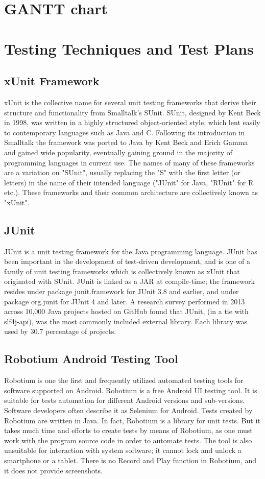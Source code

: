 	\section{GANTT chart
}
	\section{Testing Techniques and Test Plans
}
\subsection{xUnit Framework}
xUnit is the collective name for several unit testing frameworks that derive their structure and functionality from Smalltalk's SUnit. SUnit, designed by Kent Beck in 1998, was written in a highly structured object-oriented style, which lent easily to contemporary languages such as Java and C. Following its introduction in Smalltalk the framework was ported to Java by Kent Beck and Erich Gamma and gained wide popularity, eventually gaining ground in the majority of programming languages in current use. The names of many of these frameworks are a variation on "SUnit", usually replacing the "S" with the first letter (or letters) in the name of their intended language ("JUnit" for Java, "RUnit" for R etc.). These frameworks and their common architecture are collectively known as "xUnit".
\subsection{JUnit}
JUnit is a unit testing framework for the Java programming language. JUnit has been important in the development of test-driven development, and is one of a family of unit testing frameworks which is collectively known as xUnit that originated with SUnit. JUnit is linked as a JAR at compile-time; the framework resides under package junit.framework for JUnit 3.8 and earlier, and under package org.junit for JUnit 4 and later. A research survey performed in 2013 across 10,000 Java projects hosted on GitHub found that JUnit, (in a tie with slf4j-api), was the most commonly included external library. Each library was used by 30.7 percentage of projects.
\subsection{Robotium Android Testing Tool}
Robotium is one the first and frequently utilized automated testing tools for software supported on Android. Robotium is a free Android UI testing tool. It is suitable for tests automation for different Android versions and sub-versions. Software developers often describe it as Selenium for Android. Tests created by Robotium are written in Java. In fact, Robotium is a library for unit tests.
But it takes much time and efforts to create tests by means of Robotium, as one must work with the program source code in order to automate tests. The tool is also unsuitable for interaction with system software; it cannot lock and unlock a smartphone or a tablet. There is no Record and Play function in Robotium, and it does not provide screenshots.
